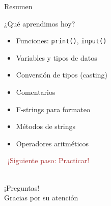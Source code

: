 \documentclass{beamer}
\begin{document}
\begin{frame}{Resumen \ \faListUl}

\begin{conceptbox}{¿Qué aprendimos hoy?}
\small
\begin{itemize}
    \item[\faCheck] Funciones: \texttt{print()}, \texttt{input()}
    \item[\faCheck] Variables y tipos de datos
    \item[\faCheck] Conversión de tipos (casting)
    \item[\faCheck] Comentarios
    \item[\faCheck] F-strings para formateo
    \item[\faCheck] Métodos de strings
    \item[\faCheck] Operadores aritméticos
\end{itemize}
\end{conceptbox}

\vspace{0.3cm}
\begin{center}
\large\textcolor{brown}{\faCode \ ¡Siguiente paso: Practicar!}
\end{center}
\end{frame}

\begin{frame}
\begin{center}
\Huge\textcolor{brown}{\faQuestionCircle}\\
\vspace{0.5cm}
\Huge ¡Preguntas!\\
\vspace{1cm}
\Large\textcolor{brownbright}{Gracias por su atención}
\end{center}
\end{frame}
\end{document}
